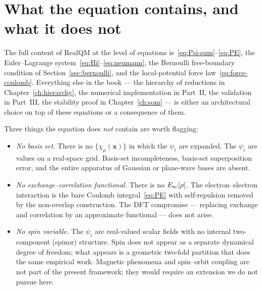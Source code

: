 \section{What the equation contains, and what it does not}

The full content of RealQM at the level of equations is~\eqref{eq:Psi-sum}--\eqref{eq:PE}, the Euler--Lagrange system~\eqref{eq:Hi}--\eqref{eq:neumann}, the Bernoulli free-boundary condition of Section~\ref{sec:bernoulli}, and the local-potential force law~\eqref{eq:force-coulomb}. Everything else in the book --- the hierarchy of reductions in Chapter~\ref{ch:hierarchy}, the numerical implementation in Part~II, the validation in Part~III, the stability proof in Chapter~\ref{ch:som} --- is either an architectural choice on top of these equations or a consequence of them.

Three things the equation does \emph{not} contain are worth flagging:

\begin{itemize}
\item \emph{No basis set.} There is no $\{\chi_\mu(\mathbf{x})\}$ in which the $\psi_i$ are expanded. The $\psi_i$ are values on a real-space grid. Basis-set incompleteness, basis-set superposition error, and the entire apparatus of Gaussian or plane-wave bases are absent.
\item \emph{No exchange--correlation functional.} There is no $E_{\rm xc}[\rho]$. The electron--electron interaction is the bare Coulomb integral~\eqref{eq:PE} with self-repulsion removed by the non-overlap construction. The DFT compromise --- replacing exchange and correlation by an approximate functional --- does not arise.
\item \emph{No spin variable.} The $\psi_i$ are real-valued scalar fields with no internal two-component (spinor) structure. Spin does not appear as a separate dynamical degree of freedom; what appears is a geometric two-fold partition that does the same empirical work. Magnetic phenomena and spin--orbit coupling are not part of the present framework; they would require an extension we do not pursue here.
\end{itemize}

